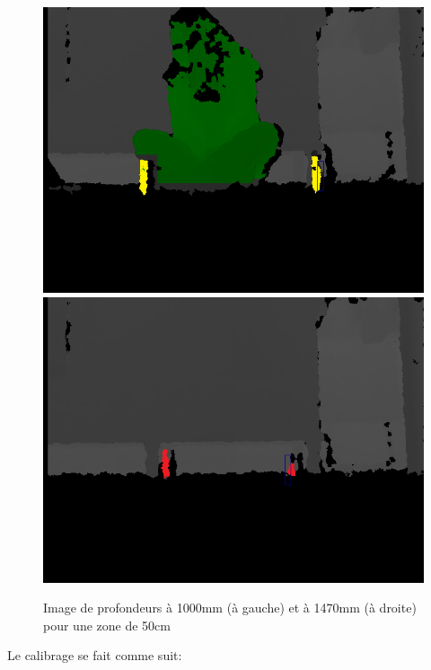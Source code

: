 \documentclass[12pt,a4paper,oneside]{book}
\begin{document}
	\begin{figure}[H]
		\centering
		\includegraphics[scale=0.45]{simuler.png}
		\includegraphics[scale=0.45]{i6.png}
		\caption{Image de profondeurs à 1000mm (à gauche) et à 1470mm (à droite) pour une zone de 50cm}
		\label{fig1m}
	\end{figure}
	
	Le calibrage se fait comme suit:
	
\end{document}
